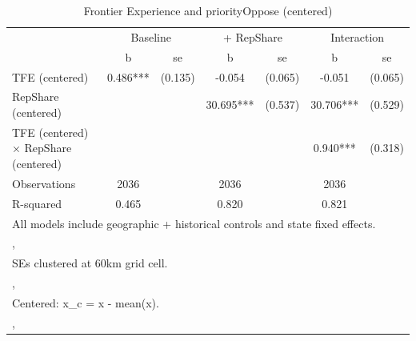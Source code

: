 \begin{table}[htbp]\centering
\def\sym#1{\ifmmode^{#1}\else\(^{#1}\)\fi}
\caption{Frontier Experience and priorityOppose (centered)}
\begin{tabular}{l*{3}{cc}}
\toprule
                &\multicolumn{2}{c}{Baseline}&\multicolumn{2}{c}{ + RepShare}&\multicolumn{2}{c}{Interaction}\\
                &        b   &       se&        b   &       se&        b   &       se\\
\midrule
TFE (centered)  &    0.486***&  (0.135)&   -0.054   &  (0.065)&   -0.051   &  (0.065)\\
RepShare (centered)&            &         &   30.695***&  (0.537)&   30.706***&  (0.529)\\
TFE (centered) $\times$ RepShare (centered)&            &         &            &         &    0.940***&  (0.318)\\
\midrule
Observations    &     2036   &         &     2036   &         &     2036   &         \\
R-squared       &    0.465   &         &    0.820   &         &    0.821   &         \\
\bottomrule
\multicolumn{7}{l}{\footnotesize All models include geographic + historical controls and state fixed effects.}\\
\multicolumn{7}{l}{\footnotesize ,}\\
\multicolumn{7}{l}{\footnotesize SEs clustered at 60km grid cell.}\\
\multicolumn{7}{l}{\footnotesize ,}\\
\multicolumn{7}{l}{\footnotesize Centered: x\_c = x - mean(x).}\\
\multicolumn{7}{l}{\footnotesize ,}\\
\end{tabular}
\end{table}
